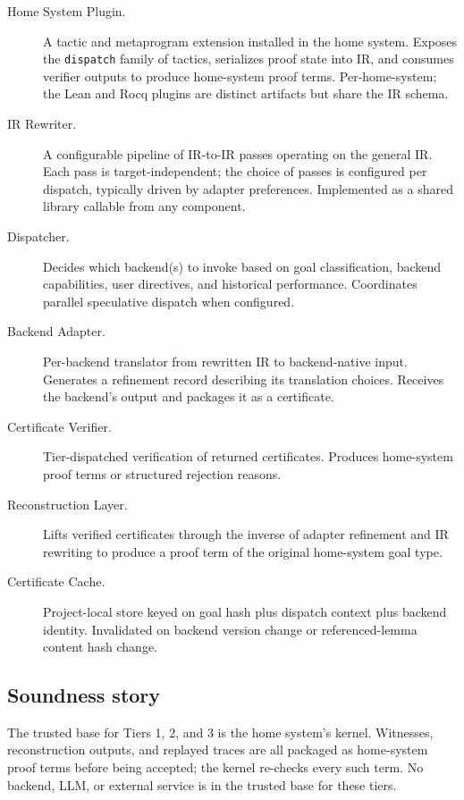 \documentclass[11pt,letterpaper]{article}
\theoremstyle{definition}
\theoremstyle{remark}
\begin{document}
\begin{description}
  \item[Home System Plugin.] A tactic and metaprogram extension installed
        in the home system. Exposes the \texttt{dispatch} family of tactics,
        serializes proof state into IR, and consumes verifier outputs to
        produce home-system proof terms. Per-home-system; the Lean and Rocq
        plugins are distinct artifacts but share the IR schema.
  \item[IR Rewriter.] A configurable pipeline of IR-to-IR passes operating
        on the general IR. Each pass is target-independent; the choice of
        passes is configured per dispatch, typically driven by adapter
        preferences. Implemented as a shared library callable from any
        component.
  \item[Dispatcher.] Decides which backend(s) to invoke based on goal
        classification, backend capabilities, user directives, and
        historical performance. Coordinates parallel speculative dispatch
        when configured.
  \item[Backend Adapter.] Per-backend translator from rewritten IR to
        backend-native input. Generates a refinement record describing its
        translation choices. Receives the backend's output and packages it
        as a certificate.
  \item[Certificate Verifier.] Tier-dispatched verification of returned
        certificates. Produces home-system proof terms or structured
        rejection reasons.
  \item[Reconstruction Layer.] Lifts verified certificates through the
        inverse of adapter refinement and IR rewriting to produce a proof
        term of the original home-system goal type.
  \item[Certificate Cache.] Project-local store keyed on goal hash plus
        dispatch context plus backend identity. Invalidated on backend
        version change or referenced-lemma content hash change.
\end{description}

\subsection{Soundness story}

The trusted base for Tiers 1, 2, and 3 is the home system's kernel.
Witnesses, reconstruction outputs, and replayed traces are all packaged as
home-system proof terms before being accepted; the kernel re-checks every
such term. No backend, LLM, or external service is in the trusted base for
these tiers.
\end{document}
